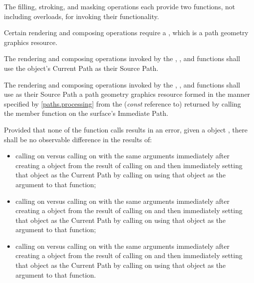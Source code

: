 \pnum
The filling, stroking, and masking operations each provide two functions, not including overloads, for invoking their functionality.

\pnum
Certain rendering and composing operations require a , which is a path geometry graphics resource.

\pnum
The rendering and composing operations invoked by the , , and  functions shall use the  object's Current Path as their Source Path.

\pnum
The rendering and composing operations invoked by the , , and  functions shall use as their Source Path a path geometry graphics resource formed in the manner specified by \ref{paths.processing} from the (\textit{const} reference to)  returned by calling the  member function on the surface's Immediate Path.

\pnum
Provided that none of the function calls results in an error, given a  object , there shall be no observable difference in the results of:
\begin{itemize}
	\item calling  on  versus calling  on  with the same arguments immediately after creating a  object from the result of calling  on  and then immediately setting that  object as the Current Path by calling  on  using that  object as the argument to that function;
	
	\item calling  on  versus calling  on  with the same arguments immediately after creating a  object from the result of calling  on  and then immediately setting that  object as the Current Path by calling  on  using that  object as the argument to that function;
	
	\item calling  on  versus calling  on  with the same arguments immediately after creating a  object from the result of calling  on  and then immediately setting that  object as the Current Path by calling  on  using that  object as the argument to that function.
\end{itemize}

